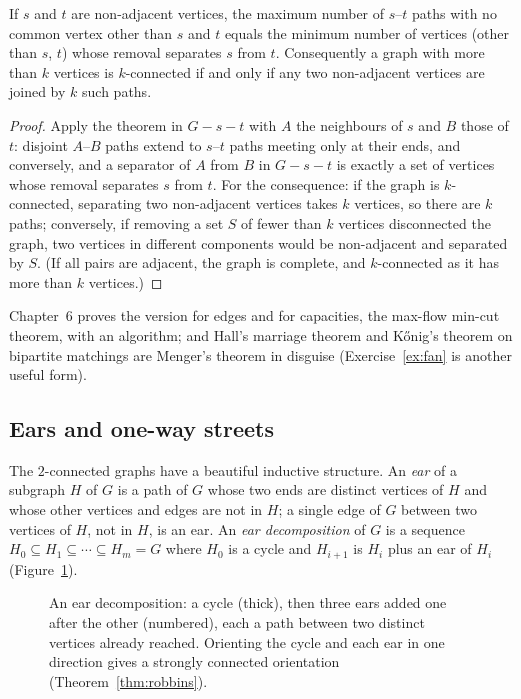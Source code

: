 \begin{corollary}\label{cor:mengerst}
If $s$ and $t$ are non-adjacent vertices, the maximum number of $s$--$t$ paths with no common vertex other than $s$ and $t$ equals the
minimum number of vertices (other than $s$, $t$) whose removal separates $s$ from $t$. Consequently a graph with more than $k$
vertices is $k$-connected if and only if any two non-adjacent vertices are joined by $k$ such paths.
\end{corollary}
\begin{proof}
Apply the theorem in $G-s-t$ with $A$ the neighbours of $s$ and $B$ those of $t$: disjoint $A$--$B$ paths extend to $s$--$t$ paths meeting only at
their ends, and conversely, and a separator of $A$ from $B$ in $G-s-t$ is exactly a set of vertices whose removal separates $s$ from $t$. For
the consequence: if the graph is $k$-connected, separating two non-adjacent vertices takes $k$ vertices, so there are $k$ paths;
conversely, if removing a set $S$ of fewer than $k$ vertices disconnected the graph, two vertices in different components would
be non-adjacent and separated by $S$. (If all pairs are adjacent, the graph is complete, and $k$-connected as it has more than $k$
vertices.)
\end{proof}

Chapter~6 proves the version for edges and for capacities, the max-flow min-cut theorem, with an algorithm; and Hall's
marriage theorem and K\H onig's theorem on bipartite matchings are Menger's theorem in disguise
(Exercise~\ref{ex:fan} is another useful form).

\subsection*{Ears and one-way streets}

The $2$-connected graphs have a beautiful inductive structure. An \emph{ear} of a subgraph $H$ of $G$ is a path of $G$ whose two ends are distinct
vertices of $H$ and whose other vertices and edges are not in $H$; a single edge of $G$ between two vertices of $H$, not in $H$, is an ear. An
\emph{ear decomposition} of $G$ is a sequence $H_0\subseteq H_1\subseteq\cdots\subseteq H_m=G$ where $H_0$ is a cycle and $H_{i+1}$ is $H_i$ plus an ear of $H_i$ (Figure~\ref{fig:ears}).

\begin{figure}[ht]
\centering
{}
\caption{An ear decomposition: a cycle (thick), then three ears added one after the other (numbered), each a path between two
distinct vertices already reached. Orienting the cycle and each ear in one direction gives a strongly connected orientation
(Theorem~\ref{thm:robbins}).}
\label{fig:ears}
\end{figure}

